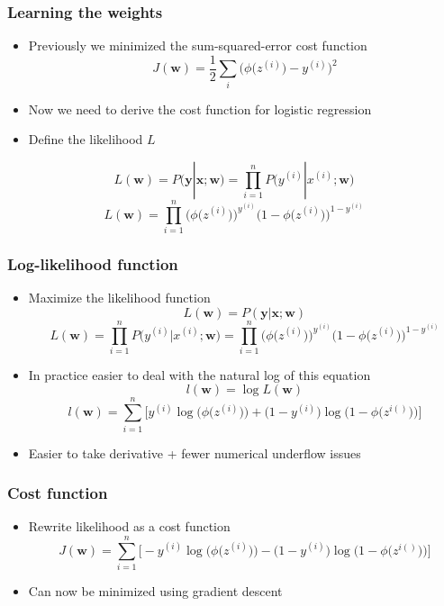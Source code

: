 \documentclass{beamer}
\begin{document}
\begin{frame}
  \frametitle{Learning the weights}
  \begin{itemize}
  \item Previously we minimized the sum-squared-error cost function
    \[
    J(\mathbf{w}) = \frac{1}{2} \sum_i \bigg( \phi \big( z^{(i)} \big) - y^{(i)}  \bigg)^2
    \]
  \item Now we need to derive the cost function for logistic regression
  \item Define the likelihood $L$
  \end{itemize}
  \[
  L(\mathbf{w}) = P(\mathbf{y} | \mathbf{x}; \mathbf{w}) = \prod_{i=1}^{n} P \big( y^{(i)} | x^{(i)}; \mathbf{w} \big)
  \]
  \[
  L(\mathbf{w}) = \prod_{i=1}^{n} \bigg( \phi \big(z^{(i)} \big) \bigg) ^ {y^{(i)}} \bigg( 1 - \phi \big( z^{(i)} \big) \bigg)^{1-y^{(i)}}
  \]
\end{frame}

\begin{frame}
  \frametitle{Log-likelihood function}
  \begin{itemize}
  \item Maximize the likelihood function
    \[
    L(\mathbf{w}) = P(\mathbf{y} | \mathbf{x}; \mathbf{w})
    \]
    \[
    L(\mathbf{w}) = \prod_{i=1}^{n} P \big( y^{(i)} | x^{(i)}; \mathbf{w} \big) =  \prod_{i=1}^{n} \bigg( \phi \big(z^{(i)} \big) \bigg) ^ {y^{(i)}} \bigg( 1 - \phi \big( z^{(i)} \big) \bigg)^{1-y^{(i)}}
    \]
  \item In practice easier to deal with the natural log of this equation
    \[
    l(\mathbf{w}) = \log L(\mathbf{w})
    \]
    \[
    l(\mathbf{w}) = \sum_{i=1}^{n} \Bigg[ y^{(i)} \log \bigg(\phi \big( z^{(i)} \big) \bigg) + \bigg(1 - y^{(i)} \bigg) \log \bigg( 1 - \phi \big( z^{i()} \big) \bigg)  \Bigg]
    \]
    \item Easier to take derivative + fewer numerical underflow issues
  \end{itemize}
\end{frame}

\begin{frame}
  \frametitle{Cost function}
  \begin{itemize}
  \item Rewrite likelihood as a cost function
    \[
    J(\mathbf{w}) = \sum_{i=1}^{n} \Bigg[- y^{(i)} \log \bigg(\phi \big( z^{(i)} \big) \bigg) - \bigg(1 - y^{(i)} \bigg) \log \bigg( 1 - \phi \big( z^{i()} \big) \bigg)  \Bigg]
    \]
  \item Can now be minimized using gradient descent
  \end{itemize} \href{https://github.com/rasbt/python-machine-learning-book/blob/master/code/ch03/ch03.ipynb}{}
\end{frame}
\end{document}
